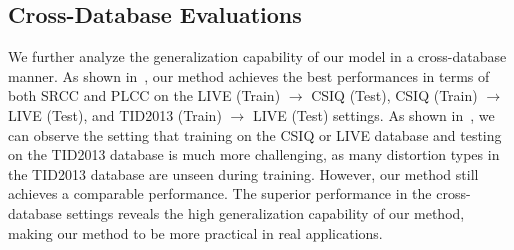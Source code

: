 \subsection{Cross-Database Evaluations}
We further analyze the generalization capability of our model in a cross-database manner. As shown in~, our method achieves the best performances in terms of both SRCC and PLCC on the LIVE (Train) $\rightarrow$ CSIQ (Test), CSIQ (Train) $\rightarrow$ LIVE (Test), and TID2013 (Train) $\rightarrow$ LIVE (Test) settings. As shown in~, we can observe the setting that training on the CSIQ or LIVE database and testing on the TID2013 database is much more challenging, as many distortion types in the TID2013 database are unseen during training. However, our method still achieves a comparable performance. The superior performance in the cross-database settings reveals the high generalization capability of our method, making our method to be more practical in real applications.

